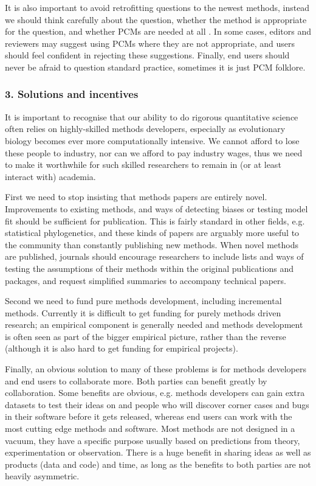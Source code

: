 \documentclass[a4paper,12pt]{article}
\begin{document}
    It is also important to avoid retrofitting questions to the newest methods, instead we should think carefully about the question, whether the method is appropriate for the question, and whether PCMs are needed at all \citep{westoby1995misinterpreting,losos2011seeing}.
    In some cases, editors and reviewers may suggest using PCMs where they are not appropriate, and users should feel confident in rejecting these suggestions.
    Finally, end users should never be afraid to question standard practice, sometimes it is just PCM folklore.

  \subsubsection{3. Solutions and incentives}
    It is important to recognise that our ability to do rigorous quantitative science often relies on highly-skilled methods developers, especially as evolutionary biology becomes ever more computationally intensive. 
    We cannot afford to lose these people to industry, nor can we afford to pay industry wages, thus we need to make it worthwhile for such skilled researchers to remain in (or at least interact with) academia.

    First we need to stop insisting that methods papers are entirely novel. 
    Improvements to existing methods, and ways of detecting biases or testing model fit should be sufficient for publication.
    This is fairly standard in other fields, e.g. statistical phylogenetics, and these kinds of papers are arguably more useful to the community than constantly publishing new methods.
    When novel methods are published, journals should encourage researchers to include lists and ways of testing the assumptions of their methods within the original publications and packages, and request simplified summaries to accompany technical papers.

    Second we need to fund pure methods development, including incremental methods. 
    Currently it is difficult to get funding for purely methods driven research; an empirical component is generally needed and methods development is often seen as part of the bigger empirical picture, rather than the reverse (although it is also hard to get funding for empirical projects). 

    Finally, an obvious solution to many of these problems is for methods developers and end users to collaborate more. 
    Both parties can benefit greatly by collaboration. 
    Some benefits are obvious, e.g. methods developers can gain extra datasets to test their ideas on and people who will discover corner cases and bugs in their software before it gets released, whereas end users can work with the most cutting edge methods and software.  
    Most methods are not designed in a vacuum, they have a specific purpose usually based on predictions from theory, experimentation or observation.
    There is a huge benefit in sharing ideas as well as products (data and code) and time, as long as the benefits to both parties are not heavily asymmetric. 
\end{document}
